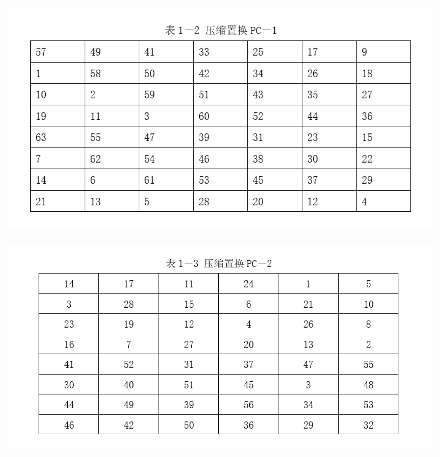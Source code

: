 \documentclass[UTF8,a4paper]{article}
\begin{document}
		\begin{figure}[!ht]
	\includegraphics[width=1.0\textwidth]{c2.PNG}
\end{figure}


		\begin{figure}[!ht]
	\includegraphics[width=1.0\textwidth]{c3.PNG}
\end{figure}
\end{document}

